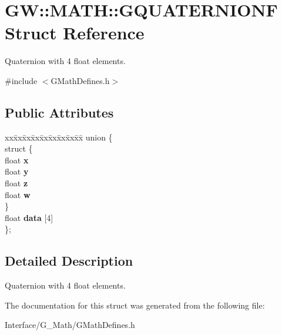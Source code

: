 \hypertarget{structGW_1_1MATH_1_1GQUATERNIONF}{}\section{GW\+::M\+A\+TH\+::G\+Q\+U\+A\+T\+E\+R\+N\+I\+O\+NF Struct Reference}
\label{structGW_1_1MATH_1_1GQUATERNIONF}


Quaternion with 4 float elements.  




{\ttfamily \#include $<$G\+Math\+Defines.\+h$>$}

\subsection*{Public Attributes}
\begin{DoxyCompactItemize}
\item 
\mbox{\label{structGW_1_1MATH_1_1GQUATERNIONF_a7c2433cf1a05874f7171de87965d1430}} 
\begin{tabbing}
xx\=xx\=xx\=xx\=xx\=xx\=xx\=xx\=xx\=\kill
union \{\\
\mbox{\label{unionGW_1_1MATH_1_1GQUATERNIONF_1_1_0D20_ae51a5baccd54f6515b443e64d7207045}} 
\>struct \{\\
\>\>float {\bfseries x}\\
\>\>float {\bfseries y}\\
\>\>float {\bfseries z}\\
\>\>float {\bfseries w}\\
\>\} \\
\>float {\bfseries data} \mbox{[}4\mbox{]}\\
\}; \\

\end{tabbing}\end{DoxyCompactItemize}


\subsection{Detailed Description}
Quaternion with 4 float elements. 

The documentation for this struct was generated from the following file\+:\begin{DoxyCompactItemize}
\item 
Interface/\+G\+\_\+\+Math/G\+Math\+Defines.\+h\end{DoxyCompactItemize}
